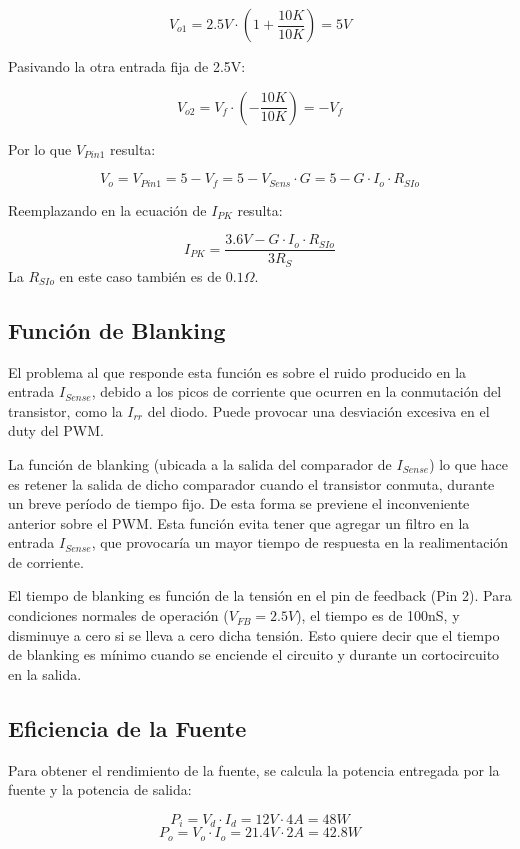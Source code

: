 \documentclass[e4_tp2_main.tex]{subfiles}
\begin{document}
\[
V_{o1} = 2.5V \cdot \left(1+ \frac{10K}{10K}\right) = 5V 
\]

Pasivando la otra entrada fija de 2.5V:

\[
V_{o2} = V_{f} \cdot \left(- \frac{10K}{10K} \right) = -V_{f}
\]

Por lo que $V_{Pin1}$ resulta:

\[
V_{o} = V_{Pin1} = 5 - V_{f} = 5 - V_{Sens} \cdot G = 5 - G \cdot I_o \cdot R_{SIo}
\]

Reemplazando en la ecuación de $I_{PK}$ resulta:

\[
I_{PK} = \frac{3.6V - G \cdot I_o \cdot R_{SIo}}{3R_S}
\]
La $R_{SIo}$ en este caso también es de $0.1\Omega$.

\subsection*{Función de Blanking}

El problema al que responde esta función es sobre el ruido producido en la entrada $I_{Sense}$, debido a los picos de corriente que ocurren en la conmutación del transistor, como la $I_{rr}$ del diodo. Puede provocar una desviación excesiva en el duty del PWM.\par
La función de blanking (ubicada a la salida del comparador de $I_{Sense}$) lo que hace es retener la salida de dicho comparador cuando el transistor conmuta, durante un breve período de tiempo fijo. De esta forma se previene el inconveniente anterior sobre el PWM. Esta función evita tener que agregar un filtro en la entrada $I_{Sense}$, que provocaría un mayor tiempo de respuesta en la realimentación de corriente.\par
El tiempo de blanking es función de la tensión en el pin de feedback (Pin 2). Para condiciones normales de operación ($V_{FB} = 2.5V$), el tiempo es de 100nS, y disminuye a cero si se lleva a cero dicha tensión. Esto quiere decir que el tiempo de blanking es mínimo cuando se enciende el circuito y durante un cortocircuito en la salida. 

\subsection*{Eficiencia de la Fuente}
Para obtener el rendimiento de la fuente, se calcula la potencia entregada por la fuente y la potencia de salida:

\[
P_i = V_d \cdot I_d = 12V \cdot 4A = 48W  
\]
\[
P_o = V_o \cdot I_o = 21.4V \cdot 2A = 42.8W
\]
\end{document}
